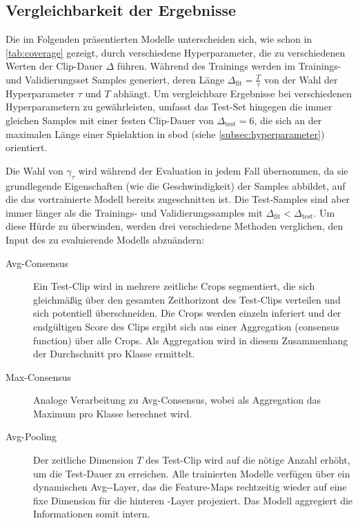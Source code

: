 \subsection{Vergleichbarkeit der Ergebnisse}
\label{sec:vergleichbarkeit-der-ergebnisse}

Die im Folgenden präsentierten Modelle unterscheiden sich, wie schon in \autoref{tab:coverage} gezeigt, durch verschiedene Hyperparameter, die zu verschiedenen Werten der Clip-Dauer $\Delta$ führen.
Während des Trainings werden im Trainings- und Validierungsset Samples generiert, deren Länge $\Delta_\text{fit} = \frac{T}{\tau}$ von der Wahl der Hyperparameter $\tau$ und $T$ abhängt.
Um vergleichbare Ergebnisse bei verschiedenen Hyperparametern zu gewährleisten, umfasst das Test-Set hingegen die immer gleichen Samples mit einer festen Clip-Dauer von $\Delta_\text{test}=6$, die sich an der maximalen Länge einer Spielaktion in \gls{sbod} (siehe \autoref{subsec:hyperparameter}) orientiert.

Die Wahl von $\gamma_\tau$ wird während der Evaluation in jedem Fall übernommen, da sie grundlegende Eigenschaften (wie die Geschwindigkeit) der Samples abbildet, auf die das vortrainierte Modell bereits zugeschnitten ist.
Die Test-Samples sind aber immer länger als die Trainings- und Validierungssamples mit $\Delta_\text{fit} < \Delta_\text{test}$.
Um diese Hürde zu überwinden, werden drei verschiedene Methoden verglichen, den Input des zu evaluierende Modells abzuändern:

\begin{description}
    \item[Avg-Consensus]
    Ein Test-Clip wird in mehrere zeitliche Crops segmentiert, die sich gleichmäßig über den gesamten Zeithorizont des Test-Clips verteilen und sich potentiell überschneiden.
    Die Crops werden einzeln inferiert und der endgültigen Score des Clips ergibt sich aus einer Aggregation (consensus function) über alle Crops.
    Als Aggregation wird in diesem Zusammenhang der Durchschnitt pro Klasse ermittelt.
    \item[Max-Consensus]
    Analoge Verarbeitung zu Avg-Consensus, wobei als Aggregation das Maximum pro Klasse berechnet wird.
    \item[Avg-Pooling]
    Der zeitliche Dimension $T$ des Test-Clip wird auf die nötige Anzahl erhöht, um die Test-Dauer zu erreichen.
    Alle trainierten Modelle verfügen über ein dynamischen Avg-\pool-Layer, das die Feature-Maps rechtzeitig wieder auf eine fixe Dimension für die hinteren \fc-Layer projeziert.
    Das Modell aggregiert die Informationen somit intern.
\end{description}

